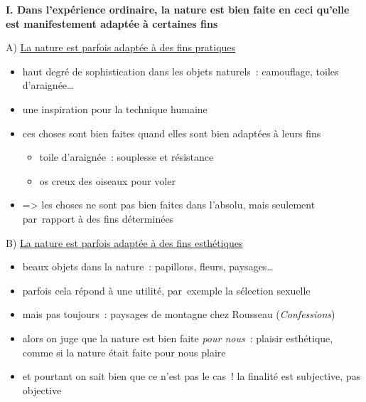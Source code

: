 \documentclass[a4paper,12pt]{report}
\begin{document}
\bigskip

\textbf{I. Dans l'expérience ordinaire, la nature est bien faite en ceci
qu'elle est manifestement adaptée à certaines fins}


\medskip

A) \uline{La nature est parfois adaptée à des fins pratiques}
\begin{itemize}
\item haut degré de sophistication dans les objets naturels : camouflage,
toiles d'araignée\ldots{}
\item une inspiration pour la technique humaine
\item ces choses sont bien faites quand elles sont bien adaptées à leurs
fins
\begin{itemize}
\item toile d'araignée : souplesse et résistance
\item os creux des oiseaux pour voler
\end{itemize}
\item => les choses ne sont pas bien faites dans l'absolu, mais seulement
par rapport à des fins déterminées
\end{itemize}

\medskip

B) \uline{La nature est parfois adaptée à des fins esthétiques} 
\begin{itemize}
\item beaux objets dans la nature : papillons, fleurs, paysages\ldots{}
\item parfois cela répond à une utilité, par exemple la sélection sexuelle
\item mais pas toujours : paysages de montagne chez Rousseau (\emph{Confessions}​)
\item alors on juge que la nature est bien faite \emph{pour nous} : plaisir
esthétique, comme si la nature était faite pour nous plaire
\item et pourtant on sait bien que ce n'est pas le cas ! la finalité est
subjective, pas objective
\end{itemize}

\medskip
\end{document}
